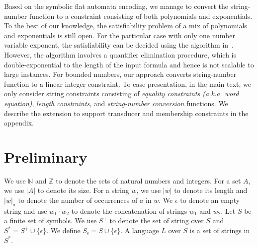 \documentclass{llncs}
\begin{document}
Based on the symbolic flat automata encoding, we manage to convert the 
string-number function to a constraint consisting of both 
polynomials and exponentials. To the best of our knowledge, the satisfiability 
problem of a mix of polynomials and exponentials is still open. For the 
particular case with only one number variable exponent, the satisfiability can 
be decided using the algorithm in~\cite{POPL2019}. However, the algorithm involves a quantifier elimination procedure, which is double-exponential to the length of the input formula and hence is not scalable to large instances.   For bounded numbers, our approach converts string-number function to a linear integer constraint.
To ease presentation, in the main text, we only consider string constraints consisting of \emph{equality constraints (a.k.a. word equation)}, \emph{length constraints}, and \emph{string-number conversion} functions. We describe the extension to support transducer and membership constraints in the appendix. 









\section{Preliminary} \label{section:preliminary}
We use $\mathbb{N}$ and $\mathbb{Z}$ to denote the sets of natural numbers and 
integers. For a set $A$, we use $|A|$ to denote its size. For a string $w$, we 
use $|w|$ to denote its length and $|w|_a$ to denote the number of occurrences of $a$ in $w$. We $\epsilon$ to denote an empty string and use $w_1\cdot w_2$ to denote the concatenation of strings $w_1$ and $w_2$. Let $S$ be a finite set of symbols. We use $S^+$ to denote the set of string over $S$ and $S^* = S^+\cup \{\epsilon\}$. We define $S_\epsilon =S\cup\{\epsilon\}$. A language 
$L$ over $S$ is a set of strings in $S^*$.
\end{document}
